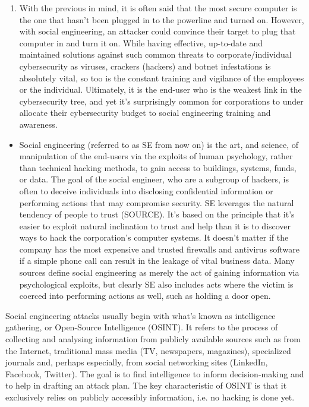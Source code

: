 \begin{enumerate}
    \item With the previous in mind, it is often said that the most secure computer is the one that hasn’t been plugged in to the powerline and turned on. However, with social engineering, an attacker could convince their target to plug that computer in and turn it on. While having effective, up-to-date and maintained solutions against such common threats to corporate/individual cybersecurity as viruses, crackers (hackers) and botnet infestations is absolutely vital, so too is the constant training and vigilance of the employees or the individual. Ultimately, it is the end-user who is the weakest link in the cybersecurity tree, and yet it’s surprisingly common for corporations to under allocate their cybersecurity budget to social engineering training and awareness.
\end{enumerate}
\begin{itemize}
    \item Social engineering (referred to as SE from now on) is the art, and science, of manipulation of the end-users via the exploits of human psychology, rather than technical hacking methods, to gain access to buildings, systems, funds, or data. The goal of the social engineer, who are a subgroup of hackers, is often to deceive individuals into disclosing confidential information or performing actions that may compromise security.  SE leverages the natural tendency of people to trust (SOURCE). It’s based on the principle that it’s easier to exploit natural inclination to trust and help than it is to discover ways to hack the corporation’s computer systems. It doesn’t matter if the company has the most expensive and trusted firewalls and antivirus software if a simple phone call can result in the leakage of vital business data. Many sources define social engineering as merely the act of gaining information via psychological exploits, but clearly SE also includes acts where the victim is coerced into performing actions as well, such as holding a door open.
\end{itemize}
Social engineering attacks usually begin with what’s known as intelligence gathering, or Open-Source Intelligence (OSINT). It refers to the process of collecting and analysing information from publicly available sources such as from the Internet, traditional mass media (TV, newspapers, magazines), specialized journals and, perhaps especially, from social networking sites (LinkedIn, Facebook, Twitter). The goal is to find intelligence to inform decision-making and to help in drafting an attack plan. The key characteristic of OSINT is that it exclusively relies on publicly accessibly information, i.e. no hacking is done yet.
